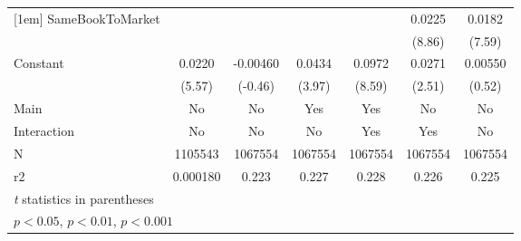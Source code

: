 {\begin{tabular}{l*{6}{c}}
[1em]
SameBookToMarket    &                     &                     &                     &                     &      0.0225\sym{***}&      0.0182\sym{***}\\
                    &                     &                     &                     &                     &      (8.86)         &      (7.59)         \\
[1em]
Constant            &      0.0220\sym{***}&    -0.00460         &      0.0434\sym{***}&      0.0972\sym{***}&      0.0271\sym{*}  &     0.00550         \\
                    &      (5.57)         &     (-0.46)         &      (3.97)         &      (8.59)         &      (2.51)         &      (0.52)         \\
\hline
Main                &          No         &          No         &         Yes         &         Yes         &          No         &          No         \\
Interaction         &          No         &          No         &          No         &         Yes         &         Yes         &          No         \\
N                   &     1105543         &     1067554         &     1067554         &     1067554         &     1067554         &     1067554         \\
r2                  &    0.000180         &       0.223         &       0.227         &       0.228         &       0.226         &       0.225         \\
\hline\hline
\multicolumn{7}{l}{\footnotesize \textit{t} statistics in parentheses}\\
\multicolumn{7}{l}{\footnotesize \sym{*} \(p<0.05\), \sym{**} \(p<0.01\), \sym{***} \(p<0.001\)}\\
\end{tabular}
}
